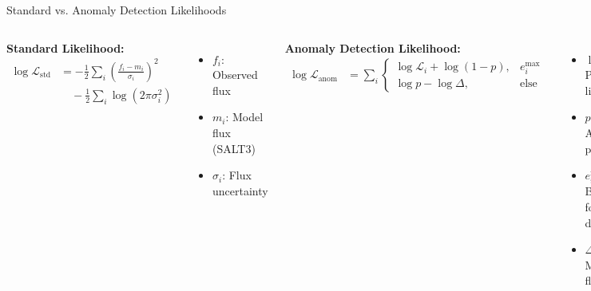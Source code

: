 \documentclass[aspectratio=169]{beamer}
\begin{document}
\begin{frame}{Standard vs. Anomaly Detection Likelihoods}
  \footnotesize
  \begin{columns}
    \textbf{Standard Likelihood:}
    \begin{align}
      \log \mathcal{L}_{\text{std}} &= -\frac{1}{2}\sum_i \left(\frac{f_i - m_i}{\sigma_i}\right)^2 \nonumber \\
      &\quad - \frac{1}{2}\sum_i \log(2\pi\sigma_i^2)
    \end{align}
    \begin{itemize}
      \item $f_i$: Observed flux
      \item $m_i$: Model flux (SALT3)
      \item $\sigma_i$: Flux uncertainty
    \end{itemize}
    
    \textbf{Anomaly Detection Likelihood:}
    \begin{align}
      \log \mathcal{L}_{\text{anom}} &= \sum_i \begin{cases}
        \log \mathcal{L}_i + \log(1-p), & e_i^{\max} \\
        \log p - \log \Delta, & \text{else}
      \end{cases}
    \end{align}
    \begin{itemize}
      \item $\log \mathcal{L}_i$: Point-wise likelihood
      \item $p$: Anomaly probability 
      \item $e_i^{\max}$: Boolean for normal data
      \item $\Delta$: Maximum flux range
    \end{itemize}
  \end{columns}
  
\end{frame}
\end{document}
